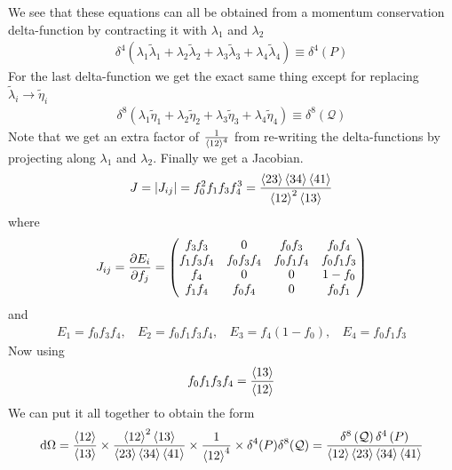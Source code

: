 \documentclass[letter,11pt]{article}
\begin{document}
We see that these equations can all be obtained from a momentum conservation delta-function by contracting it with $\lambda_1$ and $\lambda_2$
\begin{equation}
\begin{aligned}
	\delta^{4}(\lambda_1\tilde\lambda_1+\lambda_2\tilde\lambda_2+\lambda_3\tilde\lambda_3+\lambda_4\tilde\lambda_4)\equiv \delta^{4}\left(P\right)
\end{aligned}
\end{equation}
For the last delta-function we get the exact same thing except for replacing $\tilde \lambda_i\to \tilde \eta_i$
\begin{equation}
\begin{aligned}
	\delta^{8}(\lambda_1\tilde\eta_1+\lambda_2\tilde\eta_2+\lambda_3\tilde\eta_3+\lambda_4\tilde\eta_4)\equiv \delta^{8}\left(\mathcal{Q}\right)
\end{aligned}
\end{equation}
Note that we get an extra factor of $\frac{1}{\expval{12}^4}$ from re-writing the delta-functions by projecting along $\lambda_1$ and $\lambda_2$. Finally we get a Jacobian.
\begin{equation}
	\begin{aligned}
		J=\left|J_{ij}\right|=f_0^2f_1f_3f_4^3=\frac{\expval{23}\expval{34}\expval{41}}{\expval{12}^2\expval{13}}
	\end{aligned}
\end{equation}
where
\begin{equation}
	\begin{aligned}
		J_{ij}=\pdv{E_i}{f_j}=\begin{pmatrix}
			f_3f_3 & 0 & f_0f_3 & f_0f_4\\
			f_1f_3f_4 &f_0f_3f_4 &f_0f_1f_4 & f_0f_1f_3\\
			f_4 & 0 & 0 & 1-f_0\\
			f_1f_4 & f_0f_4 & 0 & f_0f_1
		\end{pmatrix}
	\end{aligned}
\end{equation}
and 
\begin{equation}
	\begin{aligned}
		E_1=f_0f_3f_4,~~~~E_2=f_0f_1f_3f_4,~~~~E_3=f_4(1-f_0),~~~~E_4=f_0f_1f_3
	\end{aligned}
\end{equation}
Now using
\begin{equation}
	\begin{aligned}
		f_0f_1f_3f_4=\frac{\expval{13}}{\expval{12}}
	\end{aligned}
\end{equation}
We can put it all together to obtain the form
\begin{equation}
	\begin{aligned}
		\dd \Omega =\frac{\expval{12}}{\expval{13}}\times \frac{\expval{12}^2\expval{13}}{
			\expval{23}\expval{34}\expval{41}}\times \frac{1}{\expval{12}^4}\times \delta^4(P)\delta^8(\mathcal{Q})=\frac{\delta^{8}\left(\mathcal{Q}\right)\delta^{4}\left(P\right)}{\expval{12}\expval{23}\expval{34}\expval{41}}
	\end{aligned}
\end{equation}
\end{document}
